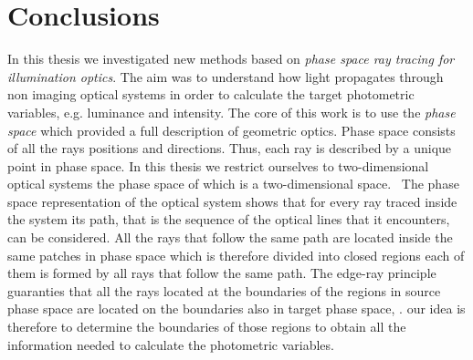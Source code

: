 \chapter{Conclusions}
In this thesis we investigated new methods based on \textit{phase space ray tracing for illumination optics}. The aim was to understand how light propagates through non imaging optical systems in order to calculate the target photometric variables, e.g. luminance and intensity. 
The core of this work is to use the \textit{phase space} which provided a full description of geometric optics. Phase space consists of all the rays positions and directions. Thus, each ray is described by a unique point in phase space. In this thesis we restrict ourselves to two-dimensional optical systems the phase space of which is a two-dimensional space. 
\ \indent The phase space representation of the optical system shows that for every ray traced inside the system its path, that is the sequence of the optical lines that it encounters, can be considered. All the rays that follow the same path are located inside the same patches in phase space which is therefore divided into closed regions each of them is formed by all rays that follow the same path. The edge-ray principle guaranties that all the rays located at the boundaries of the regions in source phase space are located on the boundaries also in target phase space, \cite{Ries:2}. our idea is therefore to determine the boundaries of those regions to obtain all the information needed to calculate the photometric variables. %
